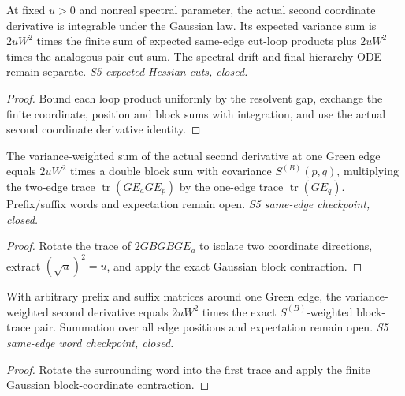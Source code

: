 \begin{lemma}
  \label{lem:loop-second-expected-cuts}
  \leanok
  At fixed $u>0$ and nonreal spectral parameter, the actual second
  coordinate derivative is integrable under the Gaussian law. Its expected
  variance sum is $2uW^2$ times the finite sum of expected same-edge
  cut-loop products plus $2uW^2$ times the analogous pair-cut sum.
  The spectral drift and final hierarchy ODE remain separate.
  \emph{S5 expected Hessian cuts, closed.}
\end{lemma}
\begin{proof}\leanok
  Bound each loop product uniformly by the resolvent gap, exchange the
  finite coordinate, position and block sums with integration, and use
  the actual second coordinate derivative identity.
\end{proof}

\begin{lemma}
  \label{lem:loop-contraction-second-same-edge}
  \leanok
  The variance-weighted sum of the actual second derivative at one Green
  edge equals $2uW^2$ times a double block sum with covariance
  $S^{(B)}(p,q)$, multiplying the two-edge trace
  $\operatorname{tr}(GE_aGE_p)$ by the one-edge trace
  $\operatorname{tr}(GE_q)$. Prefix/suffix words and expectation remain open.
  \emph{S5 same-edge checkpoint, closed.}
\end{lemma}
\begin{proof}\leanok
  Rotate the trace of $2GBGBGE_a$ to isolate two coordinate directions,
  extract $(\sqrt u)^2=u$, and apply the exact Gaussian block contraction.
\end{proof}

\begin{lemma}
  \label{lem:loop-contraction-second-same-edge-word}
  \leanok
  With arbitrary prefix and suffix matrices around one Green edge, the
  variance-weighted second derivative equals $2uW^2$ times the exact
  $S^{(B)}$-weighted block-trace pair. Summation over all edge positions
  and expectation remain open. \emph{S5 same-edge word checkpoint, closed.}
\end{lemma}
\begin{proof}\leanok
  Rotate the surrounding word into the first trace and apply the finite
  Gaussian block-coordinate contraction.
\end{proof}

